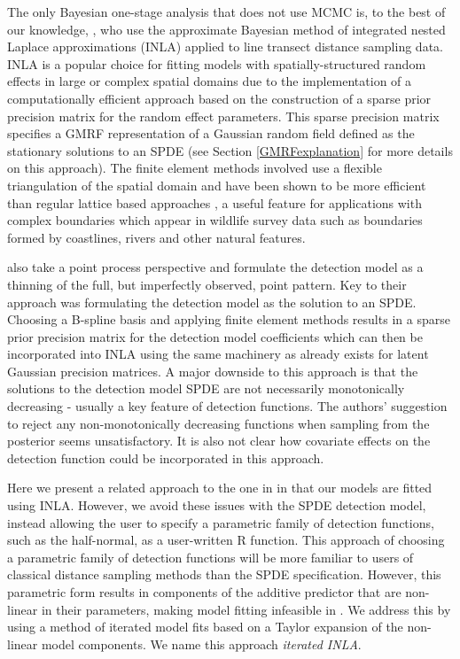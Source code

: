 \documentclass[preprint,12pt]{elsarticle}
\begin{document}
The only Bayesian one-stage analysis that does not use MCMC is, to the best of our knowledge, \citet{yuan_point_2017}, who use the approximate Bayesian method of integrated nested Laplace approximations (INLA) \citep{rue_approximate_2009} applied to line transect distance sampling data.  INLA is a popular choice for fitting models with spatially-structured random effects in large or complex spatial domains due to the implementation of a computationally efficient approach based on the construction of a sparse prior precision matrix for the random effect parameters.  This sparse precision matrix specifies a GMRF representation of a Gaussian random field defined as the stationary solutions to an SPDE \citep{lindgren_explicit_2011} (see Section \ref{GMRFexplanation} for more details on this approach).  The finite element methods involved use a flexible triangulation of the spatial domain and have been shown to be more efficient than regular lattice based approaches \citep{simpson_going_2016}, a useful feature for applications with complex boundaries which appear in wildlife survey data such as boundaries formed by coastlines, rivers and other natural features. 

\citet{yuan_point_2017} also take a point process perspective and formulate the detection model as a thinning of the full, but imperfectly observed, point pattern.  Key to their approach was formulating the detection model as the solution to an SPDE.  Choosing a B-spline basis and applying finite element methods results in a sparse prior precision matrix for the detection model coefficients which can then be incorporated into INLA using the same machinery as already exists for latent Gaussian precision matrices.  A major downside to this approach is that the solutions to the detection model SPDE are not necessarily monotonically decreasing - usually a key feature of detection functions.  The authors' suggestion to reject any non-monotonically decreasing functions when sampling from the posterior seems unsatisfactory.  It is also not clear how covariate effects on the detection function could be incorporated in this approach.  

Here we present a related approach to the one in \citet{yuan_point_2017} in that our models are fitted using INLA.  However, we avoid these issues with the SPDE detection model, instead allowing the user to specify a parametric family of detection functions, such as the half-normal, as a user-written R function.  This approach of choosing a parametric family of detection functions will be more familiar to users of classical distance sampling methods than the SPDE specification.  However, this parametric form results in components of the additive predictor that are non-linear in their parameters, making model fitting infeasible in .  We address this by using a method of iterated model fits based on a Taylor expansion of the non-linear model components.  We name this approach \textit{iterated INLA}.  
\end{document}

